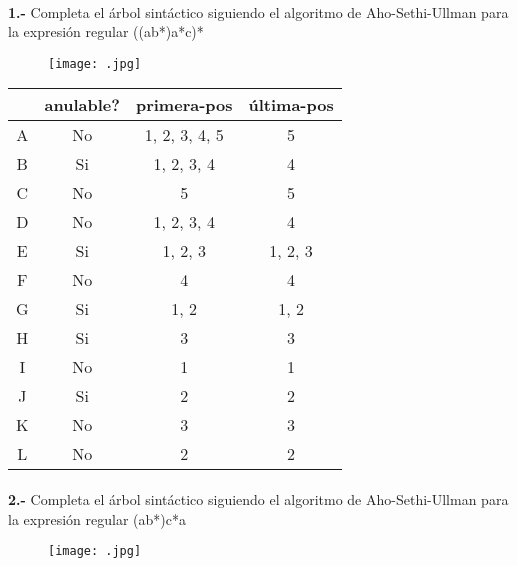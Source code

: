 \documentclass[11pt,a4paper]{report}
\begin{document}
\paragraph{}

\paragraph{}
\textbf{1.-} Completa el árbol sintáctico siguiendo el algoritmo de Aho-Sethi-Ullman para la expresión regular ((a\textbar b*)a*c)*
\begin{figure}[ht!]
\centering
\texttt{[image: .jpg]}
\end{figure}

\begin{tabular} {| c | c | c | c |}\hline
 & anulable? & primera-pos & última-pos\\ \hline
A & No & 1, 2, 3, 4, 5 & 5\\ \hline
B & Si & 1, 2, 3, 4 & 4\\ \hline
C & No & 5 & 5\\ \hline
D & No & 1, 2, 3, 4 & 4\\ \hline
E & Si & 1, 2, 3 & 1, 2, 3\\ \hline
F & No & 4 & 4\\ \hline
G & Si & 1, 2 & 1, 2\\ \hline
H & Si & 3 & 3\\ \hline
I & No & 1 & 1\\ \hline
J & Si & 2 & 2\\ \hline
K & No & 3 & 3\\ \hline
L & No & 2 & 2\\ \hline
\end{tabular}\paragraph{}
\textbf{2.-} Completa el árbol sintáctico siguiendo el algoritmo de Aho-Sethi-Ullman para la expresión regular (a\textbar b*)c*a
\begin{figure}[ht!]
\centering
\texttt{[image: .jpg]}
\end{figure}
\end{document}

